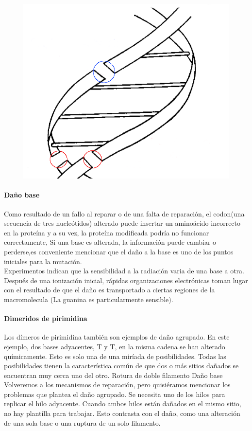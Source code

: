 \begin{figure}[htbp]
    \centering
    \includegraphics[width=0.5\linewidth]{./Figures/esbdb.png}
    \caption[Esquema rompimientos simples y dobles]{}
    \label{fig:esbdb}
\end{figure}


\paragraph{Daño base}

Como resultado de un fallo al reparar o de una falta de reparación, el codon(una secuencia de tres nucleótidos) alterado puede insertar un aminoácido incorrecto en la proteína y a su vez, la proteína modificada podría no funcionar correctamente, Si una base es alterada, la información puede cambiar o perderse,es conveniente mencionar que el daño a la base es uno de los puntos iniciales para la mutación. \\
Experimentos indican que la sensibilidad a la radiación varia de una base a otra. Después de una ionización inicial, rápidas organizaciones electrónicas toman lugar con el resultado de que el daño es transportado a ciertas regiones de la macromolecula (La guanina es particularmente sensible)\cite{Thormod}.

\paragraph{Dimeridos de pirimidina}

Los dímeros de pirimidina también son ejemplos de daño agrupado. En este ejemplo, dos bases adyacentes, T y T, en la misma cadena se han alterado químicamente. Esto es solo una de una miríada de posibilidades. Todas las posibilidades tienen la característica común de que dos o más sitios dañados se encuentran muy cerca uno del otro. Rotura de doble filamento Daño base Volveremos a los mecanismos de reparación, pero quisiéramos mencionar los problemas que plantea el daño agrupado. Se necesita uno de los hilos para replicar el hilo adyacente. Cuando ambos hilos están dañados en el mismo sitio, no hay plantilla para trabajar. Esto contrasta con el daño, como una alteración de una sola base o una ruptura de un solo filamento.

